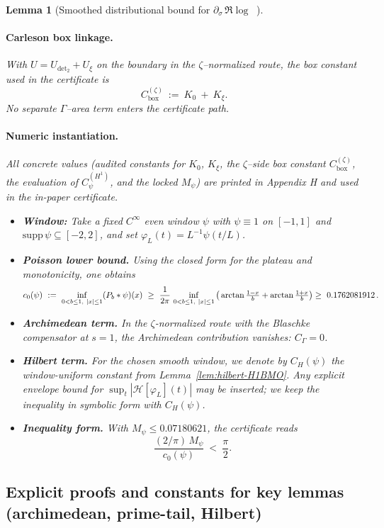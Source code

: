 \documentclass[11pt]{article}
\providecommand{\Mpsilocked}{0.07180621}%
\newtheorem{lemma}[theorem]{Lemma}
\theoremstyle{definition}
\theoremstyle{remark}
\newcommand{\Poisson}{P}
\DeclareMathOperator{\dettwo}{det_2}
\begin{document}
\begin{lemma}[Smoothed distributional bound for $\partial_\sigma\,\Re\log\dettwo$]
\paragraph{Carleson box linkage.}
With $U=U_{\det_2}+U_{\xi}$ on the boundary in the $\zeta$–normalized route, the box constant used in the certificate is
\[
  C_{\mathrm{box}}^{(\zeta)}\ :=\ K_0\ +\ K_\xi.
\]
No separate $\Gamma$–area term enters the certificate path.
\paragraph{Numeric instantiation.}
All concrete values (audited constants for $K_0$, $K_\xi$, the $\zeta$–side box constant $C_{\mathrm{box}}^{(\zeta)}$, the evaluation of $C_\psi^{(H^1)}$, and the locked $M_\psi$) are printed in Appendix H and used in the in-paper certificate.
\begin{itemize}
  \item \textbf{Window:} Take a fixed $C^\infty$ even window $\psi$ with $\psi\equiv 1$ on $[-1,1]$ and $\mathrm{supp}\,\psi\subseteq[-2,2]$, and set $\varphi_L(t)=L^{-1}\psi(t/L)$.
  \item \textbf{Poisson lower bound.} Using the closed form for the plateau and monotonicity, one obtains
  \[
    c_0(\psi)\ :=\ \inf_{0<b\le 1,\ |x|\le 1} (\Poisson_b*\psi)(x)\ \ge\ \frac{1}{2\pi}\,\inf_{0<b\le 1,\ |x|\le 1}\big(\arctan\tfrac{1-x}{b}+\arctan\tfrac{1+x}{b}\big)
    \\ \ge\ 0.1762081912\,.
  \]
  \item \textbf{Archimedean term.} In the \(\zeta\)-normalized route with the Blaschke compensator at \(s=1\), the Archimedean contribution vanishes: \(C_\Gamma=0\).
  \item \textbf{Hilbert term.} For the chosen smooth window, we denote by $C_H(\psi)$ the window-uniform constant from Lemma~\ref{lem:hilbert-H1BMO}. Any explicit envelope bound for $\sup_t |\mathcal H[\varphi_L](t)|$ may be inserted; we keep the inequality in symbolic form with $C_H(\psi)$.
  \item \textbf{Inequality form.} With $M_\psi\le \Mpsilocked$, the certificate reads
  \[
    \frac{(2/\pi)\,M_\psi}{c_0(\psi)}\ <\ \frac{\pi}{2}.
  \]
\end{itemize}

\subsection*{Explicit proofs and constants for key lemmas (archimedean, prime-tail, Hilbert)}


\end{lemma}
\end{document}
